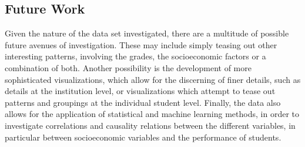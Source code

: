 \documentclass{vgtc}                          %
\begin{document}
\subsection{Future Work}

Given the nature of the data set investigated, there are a multitude of possible future avenues of investigation. These may include simply teasing out other interesting patterns, involving the grades, the socioeconomic factors or a combination of both. Another possibility is the development of more sophisticated visualizations, which allow for the discerning of finer details, such as details at the institution level, or visualizations which attempt to tease out patterns and groupings at the individual student level. Finally, the data also allows for the application of statistical and machine learning methods, in order to investigate correlations and causality relations between the different variables, in particular between socioeconomic variables and the performance of students.



%

%
%
%


\end{document}
